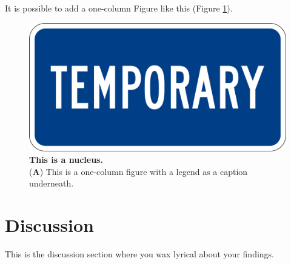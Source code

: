 It is possible to add a one-column Figure like this (Figure \ref{fig:nucleus}).

\begin{figure}
	\centering
	\includegraphics[width=0.75\linewidth]{Figures/temp.png}
	\caption{\textbf{This is a nucleus.}\\
		(\textbf{A}) This is a one-column figure with a legend as a caption underneath.}
	\label{fig:nucleus}
\end{figure}


\section*{Discussion}\label{sec:discussion}

This is the discussion section where you wax lyrical about your findings.








